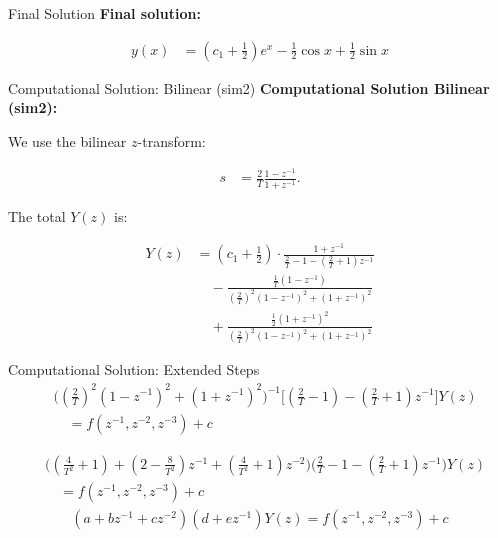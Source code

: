 \documentclass{beamer}
\begin{document}
	\begin{frame}{Final Solution}
		\textbf{Final solution:}
		
		\begin{align}
			y(x) &= \left(c_1 + \frac{1}{2}\right)e^x - \frac{1}{2}\cos x + \frac{1}{2}\sin x
		\end{align}
	\end{frame}
	\begin{frame}{Computational Solution: Bilinear (sim2)}
		\textbf{Computational Solution Bilinear (sim2):}
		
		We use the bilinear $z$-transform:
		
		\begin{align}
			s &= \frac{2}{T} \frac{1 - z^{-1}}{1 + z^{-1}}.
		\end{align}
		
		The total $Y(z)$ is:
		
		\begin{align}
			Y(z) &= 
			\left(c_1 + \frac{1}{2}\right) \cdot 
			\frac{1 + z^{-1}}{\frac{2}{T} - 1 - \left(\frac{2}{T} + 1\right)z^{-1}} \\
			&\quad - \frac{\frac{1}{T} (1 - z^{-1})}{\left(\frac{2}{T}\right)^2 (1 - z^{-1})^2 + (1 + z^{-1})^2} \\
			&\quad + \frac{\frac{1}{2} (1 + z^{-1})^2}{\left(\frac{2}{T}\right)^2 (1 - z^{-1})^2 + (1 + z^{-1})^2}
		\end{align}
	\end{frame}
	\begin{frame}{Computational Solution: Extended Steps}
		\begin{align}
			&\Bigg(
			\left(\frac{2}{T}\right)^2 \left(1 - z^{-1}\right)^2 + \left(1 + z^{-1}\right)^2
			\Bigg)^{-1} 
			\Bigg[
			\left(\frac{2}{T} - 1\right) - \left(\frac{2}{T} + 1\right)z^{-1} 
			\Bigg] Y(z) \nonumber \\
			&\quad = f(z^{-1}, z^{-2}, z^{-3}) + c
		\end{align}
		
		\begin{align}
			&\Bigg(
			\left(\frac{4}{T^2} + 1\right) + \left(2 - \frac{8}{T^2}\right)z^{-1} + \left(\frac{4}{T^2} + 1\right)z^{-2} 
			\Bigg) 
			\Bigg(\frac{2}{T} - 1 - \left(\frac{2}{T} + 1\right)z^{-1}\Bigg) Y(z) \nonumber \\
			&\quad = f(z^{-1}, z^{-2}, z^{-3}) + c
		\end{align}
		\begin{align}
			\left(a + bz^{-1} + cz^{-2}\right) \left(d + ez^{-1}\right) Y(z) = f(z^{-1}, z^{-2}, z^{-3}) + c
		\end{align}
	\end{frame}
\end{document}
